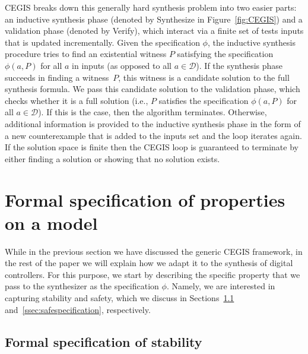 \documentclass[twocolumn]{autart}    %
\begin{document}
CEGIS breaks down this generally hard synthesis problem into two easier parts:
an inductive synthesis phase (denoted by {\sc Synthesize} in
Figure~\ref{fig:CEGIS}) and a validation phase (denoted by {\sc
  Verify}), which interact via a finite set of tests {\sc
  inputs} that is updated incrementally.
Given the specification $\phi$, the inductive synthesis procedure tries to
find an existential witness $P$ satisfying the specification
$\phi(a, P)$ for all $a$ in {\sc inputs} (as opposed to all $a \in
\mathcal{D}$).
%
If the synthesis phase succeeds in finding a witness~$P$, this witness is a
candidate solution to the full synthesis formula.  We pass this candidate
solution to the validation phase, which checks whether it is a full solution
(i.e., $P$ satisfies the specification $\phi(a, P)$ for all
$a\in\mathcal{D}$).  If this is the case, then the algorithm terminates. 
Otherwise, additional information is provided to the inductive synthesis
phase in the form of a new counterexample that is added to the {\sc inputs}
set and the loop iterates again.  %
If the solution space is finite then the CEGIS loop is guaranteed to
terminate by either finding a solution or showing that no solution
exists.
\section{Formal specification of properties on a model} 
\label{sec:specification}

While in the previous section we have discussed the generic CEGIS
framework, in the rest of the paper we will explain how we adapt it to
the synthesis of digital controllers. For this purpose, we start by
describing the specific property that we pass to the synthesizer as
the specification $\phi$. Namely, we are interested in capturing
stability and safety, which we discuss in Sections~\ref{ssec:stabspecification}
and~\ref{ssec:safespecification}, respectively.

\subsection{Formal specification of stability} 
\label{ssec:stabspecification}
\end{document}
